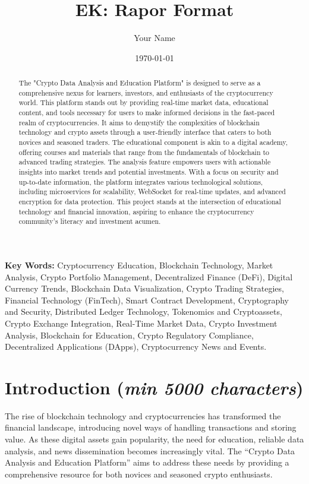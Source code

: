 \documentclass[12pt]{report}
\title{EK: Rapor Format}
\author{Your Name}
\date{\today}
\renewcommand{\thesection}{\arabic{section}}
\newcommand{\characters}[1]{(\textit{min #1 characters})}
\begin{document}
\maketitle

\begin{abstract}
The "Crypto Data Analysis and Education Platform" is designed to serve as a comprehensive nexus for learners, investors, and enthusiasts of the cryptocurrency world. This platform stands out by providing real-time market data, educational content, and tools necessary for users to make informed decisions in the fast-paced realm of cryptocurrencies. It aims to demystify the complexities of blockchain technology and crypto assets through a user-friendly interface that caters to both novices and seasoned traders. The educational component is akin to a digital academy, offering courses and materials that range from the fundamentals of blockchain to advanced trading strategies. The analysis feature empowers users with actionable insights into market trends and potential investments. With a focus on security and up-to-date information, the platform integrates various technological solutions, including microservices for scalability, WebSocket for real-time updates, and advanced encryption for data protection. This project stands at the intersection of educational technology and financial innovation, aspiring to enhance the cryptocurrency community's literacy and investment acumen.
\end{abstract}


\textbf{Key Words:} Cryptocurrency Education, Blockchain Technology, Market Analysis, Crypto Portfolio Management, Decentralized Finance (DeFi), Digital Currency Trends, Blockchain Data Visualization, Crypto Trading Strategies, Financial Technology (FinTech), Smart Contract Development, Cryptography and Security, Distributed Ledger Technology, Tokenomics and Cryptoassets, Crypto Exchange Integration, Real-Time Market Data, Crypto Investment Analysis, Blockchain for Education, Crypto Regulatory Compliance, Decentralized Applications (DApps), Cryptocurrency News and Events.


\tableofcontents
\renewcommand{\thechapter}{\arabic{chapter}}
\renewcommand{\thesection}{\arabic{section}}
\setcounter{secnumdepth}{3} %
\setcounter{tocdepth}{3} %

\newpage

\section{Introduction \characters{5000}}
The rise of blockchain technology and cryptocurrencies has transformed the financial landscape, introducing novel ways of handling transactions and storing value. As these digital assets gain popularity, the need for education, reliable data analysis, and news dissemination becomes increasingly vital. The ``Crypto Data Analysis and Education Platform'' aims to address these needs by providing a comprehensive resource for both novices and seasoned crypto enthusiasts.
\end{document}

